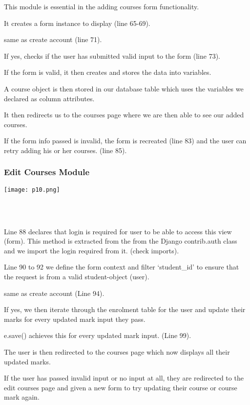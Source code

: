 \documentclass[10pt]{article}
\begin{document}
\begin{description}[font=$\bullet$~\normalfont\scshape\color{red!50!black}]
\item [] This module is essential in the adding courses form functionality. 
\item [] It creates a form instance to display (line 65-69).
\item [] same as create account (line 71).
\item [] If yes, checks if the user has submitted valid input to the form (line 73).
\item [] If the form is valid, it then creates and stores the data into variables.
\item [] A course object is then stored in our database table which uses the variables we declared as column attributes.
\item [] It then redirects us to the courses page where we are then able to see our added courses.
\item [] If the form info passed is invalid, the form is recreated (line 83) and the user can retry adding his or her courses. (line 85).

\end{description}

\subsubsection{Edit Courses Module}

\begin{center}
\texttt{[image: p10.png]}
\end{center} \\ \\

\begin{description}[font=$\bullet$~\normalfont\scshape\color{red!50!black}]
\item [] Line 88 declares that login is required for user to be able to access this view (form). This method is extracted from the  from the Django contrib.auth class and we import the login required from it. (check imports).
\item [] Line 90 to 92 we define the form context and filter ‘student\_id’ to ensure that the request is from a valid student-object (user). 
\item [] same as create account (Line 94).
\item [] If yes, we then iterate through the enrolment table for the user and update their marks for every updated mark input they pass.
\item [] e.save() achieves this for every updated mark input. (Line 99).
\item [] The user is then redirected to the courses page which now displays all their updated marks.
\item [] If the user has passed invalid input or no input at all, they are redirected to the edit courses page and given a new form to try updating their course or course mark again.

\end{description}
\end{document}
